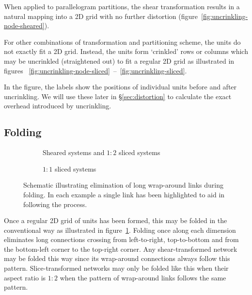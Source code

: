 			When applied to parallelogram partitions, the shear transformation
			results in a natural mapping into a 2D grid with no further distortion
			(figure~\ref{fig:uncrinkling-node-sheared}).
			
			For other combinations of transformation and partitioning scheme, the
			units do not exactly fit a 2D grid. Instead, the units form `crinkled'
			rows or columns which may be uncrinkled (straightened out) to fit a
			regular 2D grid as illustrated in figures~
			\ref{fig:uncrinkling-node-sliced}~--~\ref{fig:uncrinkling-sliced}.
			
			In the figure, the labels show the positions of individual units before
			and after uncrinkling. We will use these later in \S\ref{sec:distortion}
			to calculate the exact overhead introduced by uncrinkling.
		
		\subsection{Folding}
			
			\begin{figure}
				\begin{subfigure}{\linewidth}
					\center
					\caption{Sheared systems and $1:2$ sliced systems}
					\label{fig:folding-sheared}
				\end{subfigure}
				
				\vspace{1em}
				
				\begin{subfigure}{\linewidth}
					\center
					\caption{$1:1$ sliced systems}
					\label{fig:folding-sliced}
				\end{subfigure}
				
				\caption{Schematic illustrating elimination of long wrap-around links
				during folding. In each example a single link has been highlighted to
				aid in following the process.}
				\label{fig:folding}
			\end{figure}
			
			Once a regular 2D grid of units has been formed, this may be folded in
			the conventional way as illustrated in figure~\ref{fig:folding-sheared}.
			Folding once along each dimension eliminates long connections crossing
			from left-to-right, top-to-bottom and from the bottom-left corner to the
			top-right corner. Any shear-transformed network may be folded this way
			since its wrap-around connections always follow this pattern.
			Slice-transformed networks may only be folded like this when their aspect
			ratio is $1:2$ when the pattern of wrap-around links follows the same
			pattern.
			
